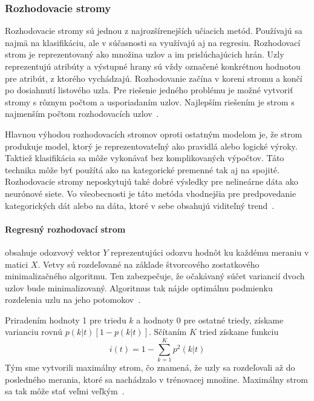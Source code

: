 \documentclass[a4paper,slovak,12pt,appendix]{article}
\begin{document}

\subsubsection{Rozhodovacie stromy}
Rozhodovacie stromy sú jednou z najrozšírenejších učiacich metód. Používajú sa
najmä na klasifikáciu, ale v súčasnosti sa využívajú aj na regresiu.
Rozhodovací strom je reprezentovaný ako množina uzlov a im prislúchajúcich
hrán. Uzly reprezentujú atribúty a výstupné hrany sú vždy označené konkrétnou
hodnotou pre atribút, z ktorého vychádzajú. Rozhodovanie začína v koreni stromu
a končí po dosiahnutí listového uzla. Pre riešenie jedného problému je možné
vytvoriť stromy s rôznym počtom a usporiadaním uzlov. Najlepším riešením je
strom s najmenším počtom rozhodovacích uzlov~\cite{Merz1998}.

Hlavnou výhodou rozhodovacích stromov oproti ostatným modelom je, že strom
produkuje model, ktorý je reprezentovateľný ako pravidlá alebo logické výroky.
Taktiež klasifikácia sa môže vykonávať bez komplikovaných výpočtov. Táto
technika môže byť použítá ako na kategorické premenné tak aj na spojité.
Rozhodovacie stromy neposkytujú také dobré výsledky pre nelineárne dáta ako
neurónové siete. Vo všeobecnosti je táto metóda vhodnejšia pre predpovedanie
kategorických dát alebo na dáta, ktoré v sebe obsahujú viditeľný
trend~\cite{Tso2007}.


\paragraph{Regresný rozhodovací strom} obsahuje odozvový vektor $Y$
reprezentujúci odozvu hodnôt ku každému meraniu v matici $X$. Vetvy sú
rozdeľované na základe štvorcového zostatkového minimalizačného algoritmu.
Ten zabezpečuje, že očakávaný súčet variancií dvoch uzlov bude minimalizovaný.
Algoritmus tak nájde optimálnu podmienku rozdelenia uzlu na jeho
potomokov~\cite{Bel2009}.

Priradením hodnoty 1 pre triedu $k$ a hodnoty 0 pre ostatné triedy, získame
varianciu rovnú $p(k|t)[1 - p(k|t)]$. Sčítaním $K$ tried získame funkciu
\begin{equation}
  i(t) = 1 - \sum_{k = 1}^K p^2 (k|t)
  \label{eq-tree-impurity}
\end{equation}
Tým sme vytvorili maximálny strom, čo znamená, že uzly sa rozdeľovali až do
posledného merania, ktoré sa nachádzalo v trénovacej množine. Maximálny strom
sa tak môže stať veľmi veľkým~\cite{Bel2009}.
\end{document}
